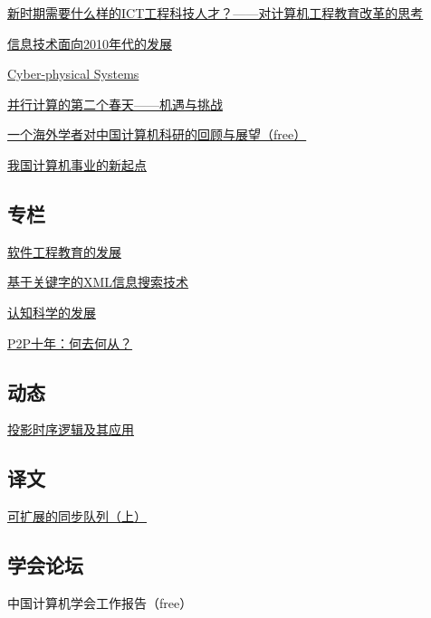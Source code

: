 \documentclass[a4paper]{article}
\begin{document}
\href{http://history.ccf.org.cn/resources/1190201776262/2010/04/15/20101-2.pdf}{新时期需要什么样的ICT工程科技人才？——对计算机工程教育改革的思考}

\href{http://history.ccf.org.cn/resources/1190201776262/2010/04/15/20101-3.pdf}{信息技术面向2010年代的发展}

\href{http://history.ccf.org.cn/resources/1190201776262/2010/04/15/20101-4.pdf}{Cyber-physical Systems}

\href{http://history.ccf.org.cn/resources/1190201776262/2010/04/16/20101-5.pdf}{并行计算的第二个春天——机遇与挑战}

\href{http://history.ccf.org.cn/resources/1190201776262/2010/04/22/20101-6.pdf}{一个海外学者对中国计算机科研的回顾与展望（free）}

\href{http://history.ccf.org.cn/resources/1190201776262/2010/04/16/20101-7.pdf}{我国计算机事业的新起点}

\subsection{专栏}
\href{http://history.ccf.org.cn/resources/1190201776262/2010/04/16/20101-8.pdf}{软件工程教育的发展}

\href{http://history.ccf.org.cn/resources/1190201776262/2010/04/16/20101-9.pdf}{基于关键字的XML信息搜索技术}

\href{http://history.ccf.org.cn/resources/1190201776262/2010/04/16/20101-10.pdf}{认知科学的发展}

\href{http://history.ccf.org.cn/resources/1190201776262/2010/04/17/20101-11.pdf}{P2P十年：何去何从？}

\subsection{动态}
\href{http://history.ccf.org.cn/resources/1190201776262/2010/04/21/20101-12.pdf}{投影时序逻辑及其应用}

\subsection{译文}
\href{http://history.ccf.org.cn/resources/1190201776262/2010/04/21/20101-13.pdf}{可扩展的同步队列（上）}

\subsection{学会论坛}
中国计算机学会工作报告（free）
\end{document}
